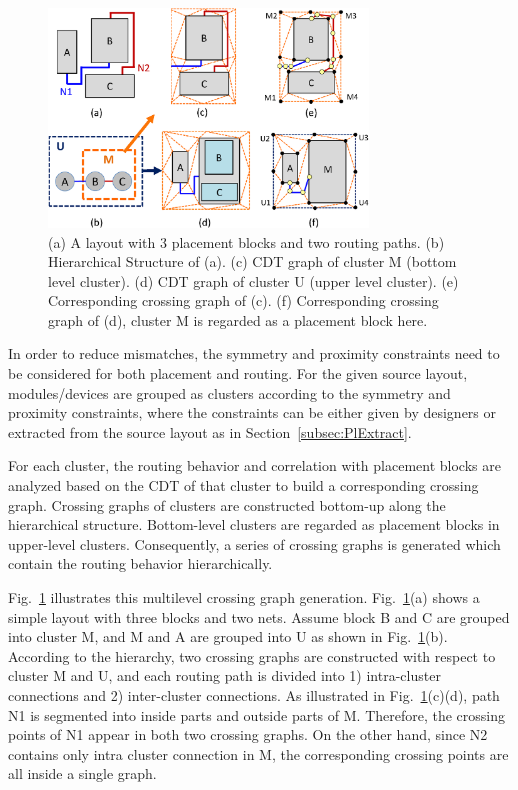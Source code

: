     \begin{figure}[t]
      \begin{center}
      \includegraphics[width=8.5cm]{Fig/HIER.eps}
      \caption{
         (a) A layout with 3 placement blocks and two routing paths. 
         (b) Hierarchical Structure of (a).
         (c) CDT graph of cluster M (bottom level cluster).
         (d) CDT graph of cluster U (upper level cluster).
         (e) Corresponding crossing graph of (c).
         (f) Corresponding crossing graph of (d), cluster M is regarded as a placement block here.
        }
      \label{fig:HIER}
      \end{center}
    \end{figure}

    In order to reduce mismatches, the symmetry and proximity constraints need to be considered for both placement and routing. 
    For the given source layout, modules/devices are grouped as clusters according to the symmetry and proximity constraints, 
    where the constraints can be either given by designers or extracted from the source layout as in Section~\ref{subsec:PlExtract}.

    For each cluster, the routing behavior and correlation with placement blocks are analyzed based on the CDT of that cluster to build a corresponding crossing graph. 
    Crossing graphs of clusters are constructed bottom-up along the hierarchical structure. 
    Bottom-level clusters are regarded as placement blocks in upper-level clusters. 
    Consequently, a series of crossing graphs is generated which contain the routing behavior hierarchically.

    Fig.~\ref{fig:HIER} illustrates this multilevel crossing graph generation.
    Fig.~\ref{fig:HIER}(a) shows a simple layout with three blocks and two nets.
    Assume block B and C are grouped into cluster M, and M and A are grouped into U as shown in Fig.~\ref{fig:HIER}(b).
    According to the hierarchy, two crossing graphs are constructed with respect to cluster M and U, and
    each routing path is divided into 1) intra-cluster connections and 2) inter-cluster connections. 
    As illustrated in Fig.~\ref{fig:HIER}(c)(d), path N1 is segmented into inside parts and outside parts of M. 
    Therefore, the crossing points of N1 appear in both two crossing graphs. 
    On the other hand, since N2 contains only intra cluster connection in M, the corresponding crossing points are all inside a single graph. 

    

